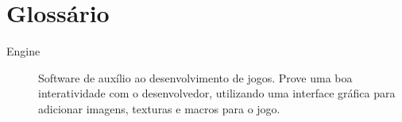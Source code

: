 
\section*{Glossário}

\begin{description}
\item[Engine ] Software de auxílio ao desenvolvimento de jogos. Prove
uma boa interatividade com o desenvolvedor, utilizando uma interface
gráfica para adicionar imagens, texturas e macros para o jogo.

\end{description}

\newpage
